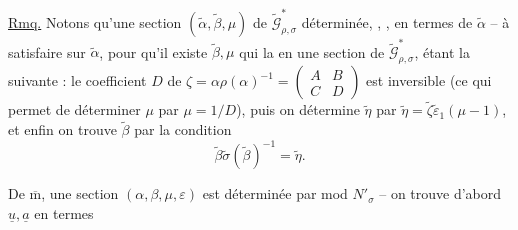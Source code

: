 
\uline{Rmq.} Notons qu'une section $(\widetilde\alpha,\widetilde\beta,\mu)$
\deleted{\unsure{$\in\Gamma$}} de $\widetilde{\mathcal G}^{*}_{\rho,\sigma}$
  déterminée,
,
  , en termes de $\widetilde\alpha$ --
 à satisfaire sur $\widetilde\alpha$, pour
qu'il existe $\widetilde\beta,\mu$  qui la
 en une section de $\widetilde{\mathcal G}^{*}_{\rho,\sigma}$,
étant la suivante : le coefficient $D$ de
$\zeta=\alpha\rho(\alpha)^{-1}=\begin{pmatrix}A&B\\C&D\end{pmatrix}$
est inversible (ce qui permet de déterminer $\mu$ par $\mu=1/D$), puis
on détermine $\widetilde\eta$  par
$\widetilde\eta=\widetilde\zeta\widetilde\varepsilon_1(\mu-1)$, et
 enfin on trouve  $\widetilde\beta$ 
par la condition
\[
\widetilde\beta\widetilde\sigma(\widetilde\beta)^{-1}=\widetilde\eta.
\]



De $\overline{\mathrm m}$, une section $(\alpha,\beta,\mu,\varepsilon)$
est déterminée par 
 mod
 $N'_\sigma$ -- on trouve d'abord
$\underline u,\underline a$ en termes


